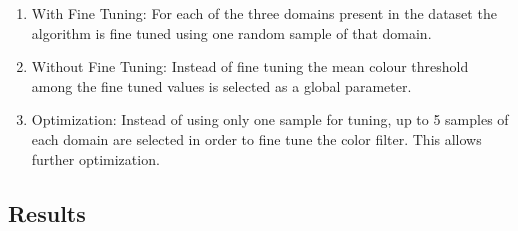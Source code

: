 \begin{enumerate}
	\item With Fine Tuning: For each of the three domains present in the dataset the algorithm is fine tuned using one random sample of that domain.
	\item Without Fine Tuning: Instead of fine tuning the mean colour threshold among the fine tuned values is selected as a global parameter.
	\item Optimization: Instead of using only one sample for tuning, up to 5 samples of each domain are selected in order to fine tune the color filter. This allows further optimization.
\end{enumerate}

\subsection{Results}

